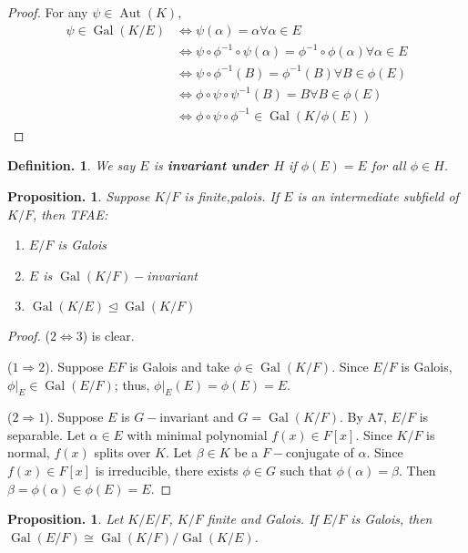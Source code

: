 \documentclass[11pt, a4paper]{memoir}
\theoremstyle{change}
\newtheorem{proposition}[theorem]{Proposition.}
\theoremstyle{plain}
\theoremstyle{nonumberplain}
\newtheorem{definition}{Definition.}
\newtheorem{proof}{Proof}
\DeclareMathOperator{\Aut}{Aut}
\DeclareMathOperator{\Gal}{Gal}
\numberwithin{equation}{section}
\begin{document}
\begin{proof}
    For any $\psi\in\Aut(K)$,
    \begin{align*}
        \psi\in\Gal(K/E) &\Leftrightarrow\psi(\alpha)=\alpha\forall\alpha\in E\\
                         &\Leftrightarrow\psi\circ\phi^{-1}\circ\psi(\alpha)=\phi^{-1}\circ\phi(\alpha)\forall\alpha\in E\\
                         &\Leftrightarrow \psi\circ\phi^{-1}(B)=\phi^{-1}(B)\forall B\in\phi(E)\\
                         &\Leftrightarrow\phi\circ\psi\circ\psi^{-1}(B)=B\forall B\in\phi(E)\\
                         &\Leftrightarrow\phi\circ\psi\circ\phi^{-1}\in\Gal(K/\phi(E))
    \end{align*}
\end{proof}
\begin{definition}
    We say $E$ is {\boldmath\bfseries invariant under $H$} if $\phi(E)=E$ for all $\phi\in H$.
\end{definition}
\begin{proposition}
    Suppose $K/F$ is finite,palois.
    If $E$ is an intermediate subfield of $K/F$, then TFAE:
    \begin{enumerate}[nolistsep]
        \item $E/F$ is Galois
        \item $E$ is $\Gal(K/F)-$invariant
        \item $\Gal(K/E)\trianglelefteq\Gal(K/F)$
    \end{enumerate}
\end{proposition}
\begin{proof}
    ($2\Leftrightarrow 3$) is clear.

    ($1\Rightarrow 2$).
    Suppose $EF$ is Galois and take $\phi\in\Gal(K/F)$.
    Since $E/F$ is Galois, $\phi|_E\in\Gal(E/F)$; thus, $\phi|_E(E)=\phi(E)=E$.

    ($2\Rightarrow 1$).
    Suppose $E$ is $G-$invariant and $G=\Gal(K/F)$.
    By A7, $E/F$ is separable.
    Let $\alpha\in E$ with minimal polynomial $f(x)\in F[x]$.
    Since $K/F$ is normal, $f(x)$ splits over $K$.
    Let $\beta\in K$ be a $F-$conjugate of $\alpha$.
    Since $f(x)\in F[x]$ is irreducible, there exists $\phi\in G$ such that $\phi(\alpha)=\beta$.
    Then $\beta=\phi(\alpha)\in\phi(E)=E$.
\end{proof}
\begin{proposition}
    Let $K/E/F$, $K/F$ finite and Galois.
    If $E/F$ is Galois, then $\Gal(E/F)\cong\Gal(K/F)/\Gal(K/E)$.
\end{proposition}
\end{document}

